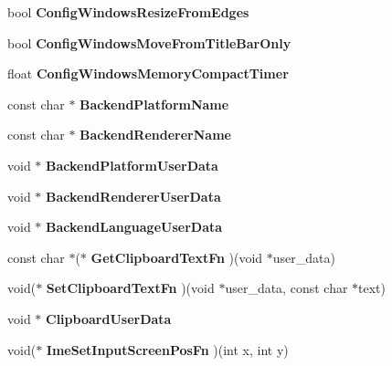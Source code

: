 \begin{DoxyCompactItemize}
bool {\bfseries Config\+Windows\+Resize\+From\+Edges}
\item 
\mbox{\label{structImGuiIO_a17f4703e015c69263170396441b321d9}} 
bool {\bfseries Config\+Windows\+Move\+From\+Title\+Bar\+Only}
\item 
\mbox{\label{structImGuiIO_a73ebbbcfd7e0d8a71e1409f56875289d}} 
float {\bfseries Config\+Windows\+Memory\+Compact\+Timer}
\item 
\mbox{\label{structImGuiIO_a58510e764707bf979d086f6bc4c8b670}} 
const char $\ast$ {\bfseries Backend\+Platform\+Name}
\item 
\mbox{\label{structImGuiIO_ad0902d7c892cff675fc0a685e8f1481d}} 
const char $\ast$ {\bfseries Backend\+Renderer\+Name}
\item 
\mbox{\label{structImGuiIO_a6c0c878d0d5ca6ef90f0968bd59309d3}} 
void $\ast$ {\bfseries Backend\+Platform\+User\+Data}
\item 
\mbox{\label{structImGuiIO_a9d1b2553e914286e9f92ab62f3d38265}} 
void $\ast$ {\bfseries Backend\+Renderer\+User\+Data}
\item 
\mbox{\label{structImGuiIO_ad5dc2e55e630b44208ef07bbbef161ea}} 
void $\ast$ {\bfseries Backend\+Language\+User\+Data}
\item 
\mbox{\label{structImGuiIO_ab7face2b2efef720a22a7fb2143d415c}} 
const char $\ast$($\ast$ {\bfseries Get\+Clipboard\+Text\+Fn} )(void $\ast$user\+\_\+data)
\item 
\mbox{\label{structImGuiIO_a1ee9c0763df33f7f3a9819235ce85078}} 
void($\ast$ {\bfseries Set\+Clipboard\+Text\+Fn} )(void $\ast$user\+\_\+data, const char $\ast$text)
\item 
\mbox{\label{structImGuiIO_a162d9da988e8985df05d262640f2f91c}} 
void $\ast$ {\bfseries Clipboard\+User\+Data}
\item 
\mbox{\label{structImGuiIO_ac59559342608fbdeb14778a4fd57c301}} 
void($\ast$ {\bfseries Ime\+Set\+Input\+Screen\+Pos\+Fn} )(int x, int y)

\end{DoxyCompactItemize}

